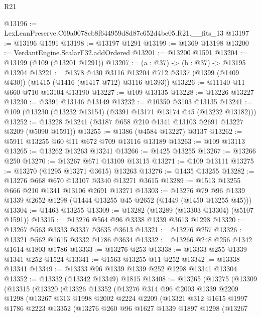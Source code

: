\begin{lexlean}{R21}
\begin{coremodule}
@13196 := LexLeanPreserve.C69a0078cb8f644959d8d87c652d4be05.R21.__fits_13
@13197 := @13196 @1591
@13198 := @13197 @1291
@13199 := @1369 @13198
@13200 := VerdantEngine.ScalarF32.addOrdered
@13201 := @13200 @1591
@13204 := @13199 (@109 (@13201 @1291))
@13207 := (a : @37) -> (b : @37) -> @13195 @13204
@13221 := @1378
    @430
    @3116
    @13204
    @712
    @3137
    (@1399 (@1409 @430))
    (@1415 (@1416 (@1417 @712) @3116 @1393))
@13226 := @11140 @11 @660 @710 @13104 @13190
@13227 := @109 @13135
@13228 := @13226 @13227
@13230 := @3391 @13146 @13149
@13232 := @10350 @3103 @13135
@13241 := @109 (@13230 (@13232 @13154) (@3391 @13171 @13174 @45 (@13232 @13182)))
@13252 := @13228 @13241 (@3187 @658 @210 @1341 @13103 @2691 @13227 @3209 (@5090 @1591))
@13255 := @1386 (@4584 @13227) @3137
@13262 := @5911 @13255 @60 @11 @672 @709 @13116 @13189
@13263 := @109 @13113
@13265 := @13262 @13263 @13241
@13266 := @1425 @13255
@13267 := @13266 @250
@13270 := @13267 @671 @13109 @13115
@13271 := @109 @13111
@13275 := @13270 (@1295 @13271 @3615) @13263
@13276 := @1435 @13255
@13282 := @13276 @668 @670 @13107 @3340 @13271 @3615
@13289 := @1513 @13255 @666 @210 @1341 @13106 @2691 @13271
@13303 := @13276 @79 @96 @1339 @1339 @2652 @1298 (@1444 @13255 @45 @2652 (@1449 (@1450 @13255 @45)))
@13304 := @1463 @13255
@13309 := @13282 (@13289 (@13303 @13304) (@5107 @1591))
@13315 := @13276 @564 @96 @3338 @1339 @3613 @1298
@13320 := @13267 @563 @3333 @3337 @3635 @3613
@13321 := @13276 @257
@13326 := @13321 @562 @1615 @3332 @1786 @3634
@13332 := @13266 @248 @256 @1342 @1614 @1803 @1786
@13333 := @13276 @253
@13338 := @13333 @255 @1339 @1341 @252 @1524
@13341 := @1563 @13255 @11 @252
@13342 := @13338 @13341
@13349 := @13333 @96 @1339 @1339 @252 @1298 @13341 @13304
@13352 := @13332 (@13342 @13349) @1815
@13408 := @13265
    (@13275
      (@13309
        (@13315
          (@13320
            (@13326
              @13352
              (@13276
                @314
                @96
                @2003
                @1339
                @2209
                @1298
                (@13267
                  @313
                  @1998
                  @2002
                  @2224
                  @2209
                  (@13321
                    @312
                    @1615
                    @1997
                    @1786
                    @2223
                    @13352
                    (@13276
                      @260
                      @96
                      @1627
                      @1339
                      @1897
                      @1298
                      (@13267

\end{coremodule}
\end{lexlean}
